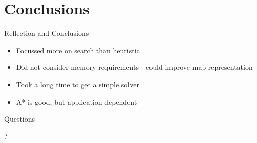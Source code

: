 \documentclass{beamer}
\begin{document}
\section{Conclusions}
\begin{frame}{Reflection and Conclusions}
  \begin{itemize}
  \item Focussed more on search than heuristic
  \item Did not consider memory requirements---could improve map representation
  \item Took a long time to get a simple solver
  \item A* is good, but application dependent
  \end{itemize}
\end{frame}

\begin{frame}{Questions}
  \begin{center}
    \Huge{?}
  \end{center}

\end{frame}
\end{document}
